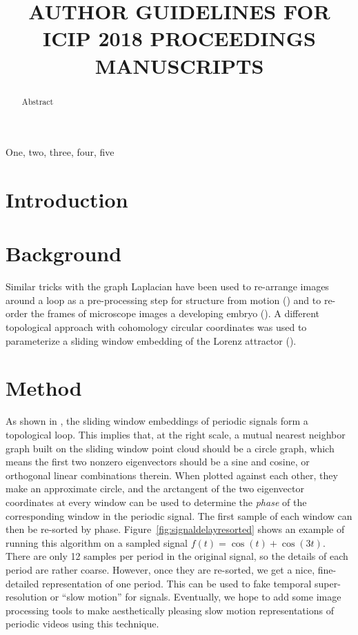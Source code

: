 \documentclass{article}
\title{AUTHOR GUIDELINES FOR ICIP 2018 PROCEEDINGS MANUSCRIPTS}
\begin{document}
%
\maketitle
%
\begin{abstract}
Abstract
\end{abstract}
%
\begin{keywords}
One, two, three, four, five
\end{keywords}
%


\section{Introduction}

\section{Background}

Similar tricks with the graph Laplacian have been used to re-arrange images around a loop as a pre-processing step for structure from motion (\cite{averbuch2015ringit}) and to re-order the frames of microscope images a developing embryo (\cite{dsilva2015diffusionvecordering}).  A different topological approach with cohomology circular coordinates was used to parameterize a sliding window embedding of the Lorenz attractor (\cite{de2012topological}).



\section{Method}
As shown in , the sliding window embeddings of periodic signals form a topological loop.  This implies that, at the right scale, a mutual nearest neighbor graph built on the sliding window point cloud should be a circle graph, which means the first two nonzero eigenvectors should be a sine and cosine, or orthogonal linear combinations therein.  When plotted against each other, they make an approximate circle, and the arctangent of the two eigenvector coordinates at every window can be used to determine the {\em phase} of the corresponding window in the periodic signal.  The first sample of each window can then be re-sorted by phase.  Figure~\ref{fig:signaldelayresorted} shows an example of running this algorithm on a sampled signal $f(t) = \cos(t) + \cos(3t)$.  There are only 12 samples per period in the original signal, so the details of each period are rather coarse.  However, once they are re-sorted, we get a nice, fine-detailed representation of one period.  This can be used to fake temporal super-resolution or ``slow motion'' for signals.  Eventually, we hope to add some image processing tools to make aesthetically pleasing slow motion representations of periodic videos using this technique.
\end{document}
